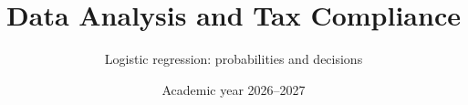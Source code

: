\documentclass[11pt,aspectratio=169]{beamer}
\title{Data Analysis and Tax Compliance}
\subtitle{Logistic regression: probabilities and decisions}
\date{Academic year 2026--2027}
\begin{document}
\begin{frame}\titlepage\end{frame}

\end{document}
